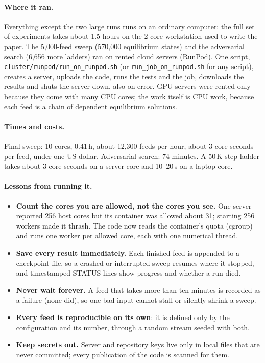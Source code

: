 \documentclass[11pt,a4paper]{article}
\begin{document}
\paragraph{Where it ran.} Everything except the two large runs runs on an ordinary computer: the full set of experiments takes about 1.5 hours on the 2-core workstation used to write the paper. The 5,000-feed sweep (570,000 equilibrium states) and the adversarial search (6,656 more ladders) ran on rented cloud servers (RunPod). One script, \texttt{cluster/runpod/run\_on\_runpod.sh} (or \texttt{run\_job\_on\_runpod.sh} for any script), creates a server, uploads the code, runs the tests and the job, downloads the results and shuts the server down, also on error. GPU servers were rented only because they come with many CPU cores; the work itself is CPU work, because each feed is a chain of dependent equilibrium solutions.

\paragraph{Times and costs.} Final sweep: 10 cores, 0.41\,h, about 12,300 feeds per hour, about 3 core-seconds per feed, under one US dollar. Adversarial search: 74 minutes. A 50\,K-step ladder takes about 3 core-seconds on a server core and 10--20\,s on a laptop core.

\paragraph{Lessons from running it.}
\begin{itemize}
\item \textbf{Count the cores you are allowed, not the cores you see.} One server reported 256 host cores but its container was allowed about 31; starting 256 workers made it thrash. The code now reads the container's quota (cgroup) and runs one worker per allowed core, each with one numerical thread.
\item \textbf{Save every result immediately.} Each finished feed is appended to a checkpoint file, so a crashed or interrupted sweep resumes where it stopped, and timestamped STATUS lines show progress and whether a run died.
\item \textbf{Never wait forever.} A feed that takes more than ten minutes is recorded as a failure (none did), so one bad input cannot stall or silently shrink a sweep.
\item \textbf{Every feed is reproducible on its own}: it is defined only by the configuration and its number, through a random stream seeded with both.
\item \textbf{Keep secrets out.} Server and repository keys live only in local files that are never committed; every publication of the code is scanned for them.
\end{itemize}
\end{document}
